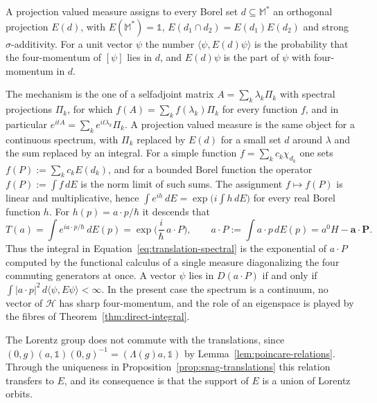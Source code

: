 \begin{remark}\label{rem:pvm-heuristic}
	A projection valued measure assigns to every Borel set $d\subseteq\mathbb{M}^*$ an orthogonal projection $E(d)$, with $E(\mathbb{M}^*)=\mathbb{1}$, $E(d_1\cap d_2)=E(d_1)E(d_2)$ and strong $\sigma$-additivity. For a unit vector $\psi$ the number $\langle\psi,E(d)\psi\rangle$ is the probability that the four-momentum of $[\psi]$ lies in $d$, and $E(d)\psi$ is the part of $\psi$ with four-momentum in $d$.
	
	The mechanism is the one of a selfadjoint matrix $A=\sum_k\lambda_k\Pi_k$ with spectral projections $\Pi_k$, for which $f(A)=\sum_kf(\lambda_k)\Pi_k$ for every function $f$, and in particular $e^{itA}=\sum_ke^{it\lambda_k}\Pi_k$. A projection valued measure is the same object for a continuous spectrum, with $\Pi_k$ replaced by $E(d)$ for a small set $d$ around $\lambda$ and the sum replaced by an integral. For a simple function $f=\sum_kc_k\chi_{d_k}$ one sets $f(P):=\sum_kc_kE(d_k)$, and for a bounded Borel function the operator $f(P):=\int f\,dE$ is the norm limit of such sums. The assignment $f\mapsto f(P)$ is linear and multiplicative, hence $\int e^{ih}\,dE=\exp\!\big(i\int h\,dE\big)$ for every real Borel function $h$. For $h(p)=a\cdot p/\hbar$ it descends that
	\begin{equation*}
		T(a)=\int e^{ia\cdot p/\hbar}\,dE(p)=\exp\Big(\frac{i}{\hbar}\,a\cdot P\Big), \qquad a\cdot P:=\int a\cdot p\,dE(p)=a^0H-\mathbf{a}\cdot\mathbf{P}.
	\end{equation*}
	Thus the integral in Equation~\eqref{eq:translation-spectral} is the exponential of $a\cdot P$ computed by the functional calculus of a single measure diagonalizing the four commuting generators at once. A vector $\psi$ lies in $D(a\cdot P)$ if and only if $\int|a\cdot p|^2\,d\langle\psi,E\psi\rangle<\infty$. In the present case the spectrum is a continuum, no vector of $\mathcal{H}$ has sharp four-momentum, and the role of an eigenspace is played by the fibres of Theorem~\ref{thm:direct-integral}.
\end{remark}

The Lorentz group does not commute with the translations, since $(0,g)(a,\mathbb{1})(0,g)^{-1}=(\Lambda(g)a,\mathbb{1})$ by Lemma~\ref{lem:poincare-relations}. Through the uniqueness in Proposition~\ref{prop:snag-translations} this relation transfers to $E$, and its consequence is that the support of $E$ is a union of Lorentz orbits.

